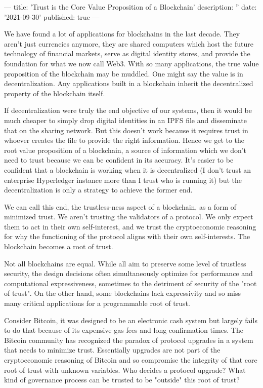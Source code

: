 ---
title: 'Trust is the Core Value Proposition of a Blockchain'
description: ''
date: '2021-09-30'
published: true
---

We have found a lot of applications for blockchains in the last decade. They aren't just currencies anymore, they are shared computers which host the future technology of financial markets, serve as digital identity stores, and provide the foundation for what we now call Web3. With so many applications, the true value proposition of the blockchain may be muddled. One might say the value is in decentralization. Any applications built in a blockchain inherit the decentralized property of the blockchain itself.

If decentralization were truly the end objective of our systems, then it would be much cheaper to simply drop digital identities in an IPFS file and disseminate that on the sharing network. But this doesn't work because it requires trust in whoever creates the file to provide the right information. Hence we get to the root value proposition of a blockchain, a source of information which we don't need to trust because we can be confident in its accuracy. It's easier to be confident that a blockchain is working when it is decentralized (I don't trust an enterprise Hyperledger instance more than I trust who is running it) but the decentralization is only a strategy to achieve the former end.

We can call this end, the trustless-ness aspect of a blockchain, as a form of minimized trust. We aren't trusting the validators of a protocol. We only expect them to act in their own self-interest, and we trust the cryptoeconomic reasoning for why the functioning of the protocol aligns with their own self-interests. The blockchain becomes a root of trust.

Not all blockchains are equal. While all aim to preserve some level of trustless security, the design decisions often simultaneously optimize for performance and computational expressiveness, sometimes to the detriment of security of the "root of trust". On the other hand, some blockchains lack expressivity and so miss many critical applications for a programmable root of trust.

Consider Bitcoin, it was designed to be an electronic cash system but largely fails to do that because of its expensive gas fees and long confirmation times. The Bitcoin community has recognized the paradox of protocol upgrades in a system that needs to minimize trust. Essentially upgrades are not part of the cryptoeconomic reasoning of Bitcoin and so compromise the integrity of that core root of trust with unknown variables. Who decides a protocol upgrade? What kind of governance process can be trusted to be "outside" this root of trust?

